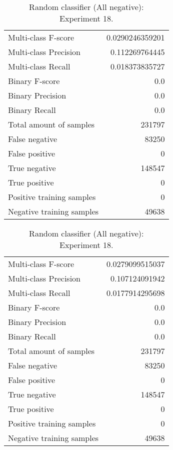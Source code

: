 \begin{table}[H]
\begin{minipage}{0.5\textwidth}
\caption{Random classifier (All negative): \\Experiment 17.}
\centering
\begin{tabular}{l r}
\toprule
Multi-class F-score & 0.0290246359201 \\
Multi-class Precision & 0.112269764445 \\
Multi-class Recall & 0.018373835727 \\
\midrule
Binary F-score & 0.0 \\
Binary Precision & 0.0 \\
Binary Recall & 0.0 \\
\midrule
Total amount of samples & 231797 \\
False negative & 83250 \\
False positive & 0 \\
True negative & 148547 \\
True positive & 0 \\
\midrule
Positive training samples & 0 \\
Negative training samples & 49638 \\
\bottomrule
\end{tabular}
\end{minipage}
\hfillx
\begin{minipage}{0.5\textwidth}
\caption{Random classifier (All negative): \\Experiment 18.}
\centering
\begin{tabular}{l r}
\toprule
Multi-class F-score & 0.0279099515037 \\
Multi-class Precision & 0.107124091942 \\
Multi-class Recall & 0.0177914295698 \\
\midrule
Binary F-score & 0.0 \\
Binary Precision & 0.0 \\
Binary Recall & 0.0 \\
\midrule
Total amount of samples & 231797 \\
False negative & 83250 \\
False positive & 0 \\
True negative & 148547 \\
True positive & 0 \\
\midrule
Positive training samples & 0 \\
Negative training samples & 49638 \\
\bottomrule
\end{tabular}
\end{minipage}
\end{table}

